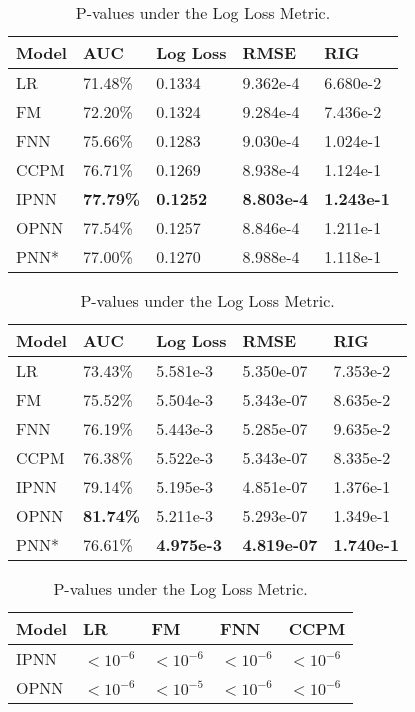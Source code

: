 \documentclass[conference]{IEEEtran}
\begin{document}
\begin{table}[t]
	\centering
	\caption{Overall Performance on the Criteo Dataset.}\label{tab:perf-criteo}
	\begin{tabular}{m{40pt}<{\centering} | m{35pt}<{\centering} m{35pt}<{\centering} m{35pt}<{\centering} m{35pt}<{\centering}}
		\hline
		Model & AUC & Log Loss & RMSE & RIG \\
		\hline
		LR & 71.48\% & 0.1334 & 9.362e-4 & 6.680e-2 \\
		FM & 72.20\% & 0.1324 & 9.284e-4 & 7.436e-2 \\
		FNN & 75.66\% & 0.1283 & 9.030e-4 & 1.024e-1 \\
		CCPM & 76.71\% & 0.1269 & 8.938e-4 & 1.124e-1 \\
		IPNN & \textbf{77.79\%} & \textbf{0.1252} & \textbf{8.803e-4} & \textbf{1.243e-1} \\
		OPNN & 77.54\% & 0.1257 & 8.846e-4 & 1.211e-1 \\
		PNN* & 77.00\% & 0.1270 & 8.988e-4 & 1.118e-1\\
		\hline
	\end{tabular}
\vspace{10pt}
	\centering
	\caption{Overall Performance on the iPinYou Dataset.}\label{tab:perf-ipinyou}
	\begin{tabular}{m{40pt}<{\centering} | m{35pt}<{\centering} m{35pt}<{\centering} m{35pt}<{\centering} m{35pt}<{\centering}}
		\hline
		Model & AUC & Log Loss & RMSE & RIG \\
		\hline
		LR & 73.43\% & 5.581e-3 & 5.350e-07 & 7.353e-2 \\
		FM & 75.52\% & 5.504e-3 & 5.343e-07 & 8.635e-2 \\
		FNN & 76.19\% & 5.443e-3 & 5.285e-07 & 9.635e-2 \\
		CCPM & 76.38\% & 5.522e-3 & 5.343e-07 & 8.335e-2 \\
		IPNN & 79.14\% & 5.195e-3 & 4.851e-07 & 1.376e-1\\
		OPNN & \textbf{81.74\%} & 5.211e-3 & 5.293e-07 & 1.349e-1 \\
		PNN* & 76.61\% & \textbf{4.975e-3} & \textbf{4.819e-07} & \textbf{1.740e-1}\\
		\hline
	\end{tabular}
\centering
	\vspace{10pt}
    \caption{P-values under the Log Loss Metric.}\label{tab:pvalue}
\begin{tabular}{m{40pt}<{\centering} | m{35pt}<{\centering} m{35pt}<{\centering} m{35pt}<{\centering} m{35pt}<{\centering}}
		\hline
		Model & LR & FM & FNN & CCPM \\
		\hline
		IPNN & $< 10^{-6}$ & $< 10^{-6}$ & $< 10^{-6}$ & $< 10^{-6}$ \\
		OPNN & $< 10^{-6}$ & $< 10^{-5}$ & $< 10^{-6}$ & $< 10^{-6}$ \\
		\hline
	\end{tabular}
\end{table}
\end{document}
